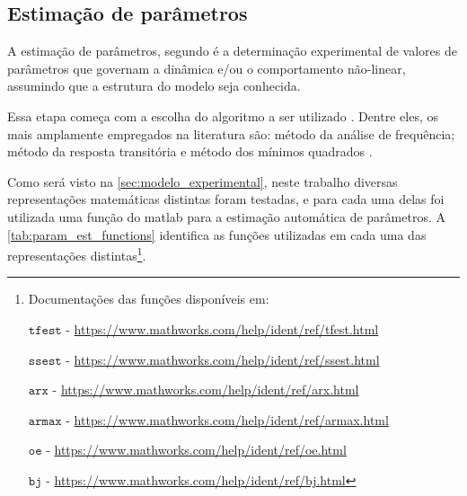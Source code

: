 \subsection{Estimação de parâmetros}
\label{subsec:estimacao_de_parametros}

A estimação de parâmetros, segundo  é a determinação experimental
de valores de parâmetros que governam a dinâmica e/ou o comportamento não-linear, assumindo que a
estrutura do modelo seja conhecida.

Essa etapa começa com a escolha do algoritmo a ser utilizado \cite{Aguirre2015}. Dentre eles, os
mais amplamente empregados na literatura são: método da análise de frequência; método da resposta
transitória e método dos mínimos quadrados \cite{Favaro2012}.

Como será visto na \cref{sec:modelo_experimental}, neste trabalho diversas representações matemáticas
distintas foram testadas, e para cada uma delas foi utilizada uma função do \acrshort{matlab} para 
a estimação automática de parâmetros. A \cref{tab:param_est_functions} identifica as funções
utilizadas em cada uma das representações distintas\footnote{
    Documentações das funções disponíveis em:

    $\mathtt{tfest}$ - \url{https://www.mathworks.com/help/ident/ref/tfest.html}

    $\mathtt{ssest}$ - \url{https://www.mathworks.com/help/ident/ref/ssest.html}

    $\mathtt{arx}$ - \url{https://www.mathworks.com/help/ident/ref/arx.html}

    $\mathtt{armax}$ - \url{https://www.mathworks.com/help/ident/ref/armax.html}

    $\mathtt{oe}$ - \url{https://www.mathworks.com/help/ident/ref/oe.html}

    $\mathtt{bj}$ - \url{https://www.mathworks.com/help/ident/ref/bj.html}
}.

